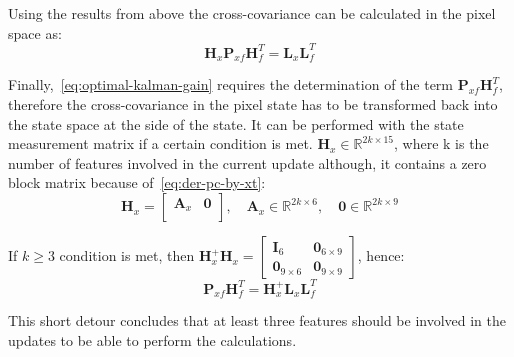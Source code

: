 Using the results from above the cross-covariance can be calculated in the pixel space as:
\begin{equation}
    \mathbf{H}_x\mathbf{P}_{xf}\mathbf{H}_f^T=\mathbf{L}_x\mathbf{L}_f^T
\end{equation}

Finally,~\eqref{eq:optimal-kalman-gain} requires the determination of the term $\mathbf{P}_{xf}\mathbf{H}_{f}^T$, therefore the cross-covariance in the pixel state has to be transformed back into the state space at the side of the state. It can be performed with the state measurement matrix if a certain condition is met. $\mathbf{H}_x\in\mathbb{R}^{2k\times 15}$, where k is the number of features involved in the current update although, it contains a zero block matrix because of~\eqref{eq:der-pc-by-xt}:
\begin{equation}
    \mathbf{H}_x = \begin{bmatrix}
    \mathbf{A}_x & \mathbf{0} \\
    \end{bmatrix}, \quad \mathbf{A}_x\in\mathbb{R}^{2k\times 6}, \quad \mathbf{0}\in\mathbb{R}^{2k\times 9}
\end{equation}

If $k\geq 3$ condition is met, then $\mathbf{H}_x^+\mathbf{H}_x=\begin{bmatrix}\mathbf{I}_6 & \mathbf{0}_{6\times 9} \\ \mathbf{0}_{9\times 6} & \mathbf{0}_{9\times 9}\end{bmatrix}$, hence:
\begin{equation}
    \mathbf{P}_{xf}\mathbf{H}_f^T = \mathbf{H}_x^+\mathbf{L}_x\mathbf{L}_f^T
\end{equation}

This short detour concludes that at least three features should be involved in the updates to be able to perform the calculations.